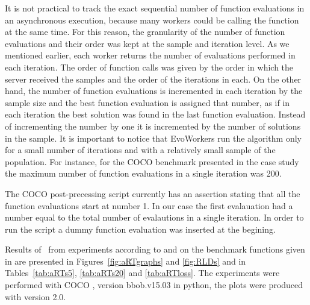 \documentclass[sigconf]{acmart}
\begin{document}
It is not practical to track the exact sequential 
number of function evaluations in an asynchronous 
execution, because many workers could be calling 
the function at the same time. For this reason, the 
granularity of the number of function evaluations and 
their order was kept at the sample and iteration level. 
As we mentioned earlier, each worker returns the number 
of evaluations performed in each iteration. The order 
of function calls was given by the order in which the 
server received the samples and the order of the 
iterations in each. On the other hand, the number of 
function evaluations is incremented in each iteration 
by the sample size and the best function evaluation is 
assigned that number,  as if in each iteration the best 
solution was found in the last function evaluation. Instead 
of incrementing the number by one it is incremented by the 
number of solutions in the sample. 
It is important to notice that EvoWorkers run the algorithm 
only for a small number of iterations and with 
a relatively small sample of the population. For instance,
for the COCO benchmark presented in the case study the maximum number of 
function evaluations in a single iteration was 200.

The COCO post-precessing script currently has an assertion stating
that all the function evaluations start at number 1. In our
case the first evalauation had a number equal to the total number
of evalautions in a single iteration. In order to run the script 
a dummy function evaluation was inserted at the begining. 

Results of \algname\ from experiments according to \cite{hansen2016exp} and \cite{hansen2016perfass} on the benchmark
functions given in \cite{wp200901_2010,hansen2012fun} are presented in
Figures~\ref{fig:aRTgraphs} and \ref{fig:RLDs}  and in
Tables~\ref{tab:aRTs5}, \ref{tab:aRTs20} and \ref{tab:aRTloss}. The experiments were performed with COCO \cite{hansen2016cocoplat}, version bbob.v15.03 in
python, the plots were produced with version 2.0.



\end{document}

